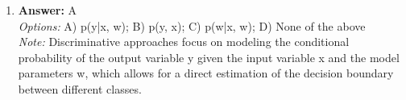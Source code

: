 \documentclass[12pt]{article}
\begin{document}
\begin{enumerate}[label=\arabic*.]
\\ \textit{Note:} The correct answer reflects the structure of the Bayes net, where Y is a parent of both X and Z, allowing the joint probability distribution to be factored into the product of the marginal probability of Y and the conditional probabilities of X given Y and Z given Y.
\item \textbf{Answer:} A
\\ \textit{Options:} A) p(y|x, w); B) p(y, x); C) p(w|x, w); D) None of the above
\\ \textit{Note:} Discriminative approaches focus on modeling the conditional probability of the output variable y given the input variable x and the model parameters w, which allows for a direct estimation of the decision boundary between different classes.
\end{enumerate}
\end{document}
